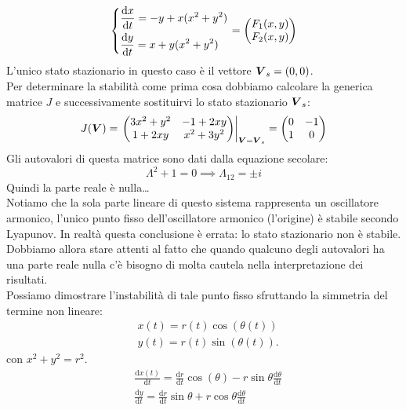 \noindent
\begin{exmp}
    \[\begin{dcases}
	\frac{\text{d} x}{\text{d} t} = - y + x(x^2+y^2)\\
	\frac{\text{d} y}{\text{d} t} = x + y(x^2+y^2)
    \end{dcases}
    =
    \begin{pmatrix} F_1(x, y)\\ F_2(x, y) \end{pmatrix} 
    \] 
    L'unico stato stazionario in questo caso è il vettore $\boldsymbol{V}_s = (0,0)$.\\
    Per determinare la stabilità come prima cosa dobbiamo calcolare la generica matrice $J$ e successivamente sostituirvi lo stato stazionario $\boldsymbol{V}_s$:
    \[
	J(\boldsymbol{V})=
        \left.
	\begin{pmatrix} 
	    3x^2 + y^2 & -1 + 2xy \\
	    1 + 2xy & x^2 + 3y^2
	\end{pmatrix} 
        \right|_{\boldsymbol{V} = \boldsymbol{V}_s} = 
	\begin{pmatrix} 0 & -1 \\ 1 & 0 \end{pmatrix} 
    \] 
    Gli autovalori di questa matrice sono dati dalla equazione secolare:
    \[
        \Lambda^2+1 = 0 \implies  \Lambda_{12} = \pm i
    \] 
    Quindi la parte reale è nulla\ldots\\
    Notiamo che la sola parte lineare di questo sistema rappresenta un oscillatore armonico, l'unico punto fisso dell'oscillatore armonico (l'origine) è stabile secondo Lyapunov. In realtà questa conclusione è errata: lo stato stazionario non è stabile. \\
    Dobbiamo allora stare attenti al fatto che quando qualcuno degli autovalori ha una parte reale nulla c'è bisogno di molta cautela nella interpretazione dei risultati.\\
    Possiamo dimostrare l'instabilità di tale punto fisso sfruttando la simmetria del termine non lineare:
    \[\begin{aligned}
	&x(t)= r(t)\cos (\theta (t))\\
	&y(t)= r(t)\sin (\theta (t))
    .\end{aligned}\]
    con $x^2+y^2 = r^2$.
    \[\begin{aligned}
	&\frac{\text{d} x(t)}{\text{d} t} = \frac{\text{d} r}{\text{d} t} \cos (\theta)- r\sin\theta\frac{\text{d} \theta}{\text{d} t} \\
	&\frac{\text{d} y}{\text{d} t} = \frac{\text{d} r}{\text{d} t} \sin\theta  + r\cos\theta  \frac{\text{d} \theta}{\text{d} t} 

\end{aligned}\]
\end{exmp}
